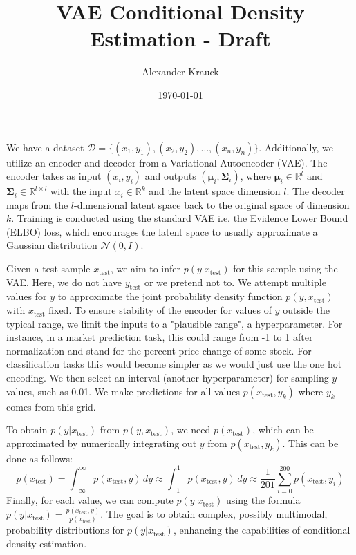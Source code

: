 \documentclass[11pt]{article}
\title{ VAE Conditional Density Estimation - Draft}
\author{ Alexander Krauck}
\date{\today}
\begin{document}
\maketitle	

We have a dataset $\mathcal{D} = \{(x_1, y_1), (x_2, y_2), \dots, (x_n, y_n)\}$. Additionally, we utilize an encoder and decoder from a Variational Autoencoder (VAE). The encoder takes as input $(x_i, y_i)$ and outputs $(\mathbf{\mu}_i, \mathbf{\Sigma}_i)$, where $\mathbf{\mu}_i \in \mathbb{R}^l$ and $\mathbf{\Sigma}_i \in \mathbb{R}^{l \times l}$ with the input $x_i \in \mathbb{R}^k$ and the latent space dimension $l$. The decoder maps from the $l$-dimensional latent space back to the original space of dimension $k$. Training is conducted using the standard VAE i.e. the Evidence Lower Bound (ELBO) loss, which encourages the latent space to usually approximate a Gaussian distribution $\mathcal{N}(0, I)$.

Given a test sample $x_{\text{test}}$, we aim to infer $p(y|x_{\text{test}})$ for this sample using the VAE. Here, we do not have $y_{\text{test}}$ or we pretend not to. We attempt multiple values for $y$ to approximate the joint probability density function $p(y, x_{\text{test}})$ with $x_{\text{test}}$ fixed. To ensure stability of the encoder for values of $y$ outside the typical range, we limit the inputs to a "plausible range", a hyperparameter. For instance, in a market prediction task, this could range from -1 to 1 after normalization and stand for the percent price change of some stock. For classification tasks this would become simpler as we would just use the one hot encoding. We then select an interval (another hyperparameter) for sampling $y$ values, such as 0.01. We make predictions for all values $p(x_{\text{test}}, y_k)$ where $y_k$ comes from this grid.

To obtain $p(y|x_{\text{test}})$ from $p(y, x_{\text{test}})$, we need $p(x_{\text{test}})$, which can be approximated by numerically integrating out $y$ from $p(x_{\text{test}}, y_k)$. This can be done as follows:
\[ p(x_{\text{test}}) = \int_{-\infty}^{\infty} p(x_{\text{test}}, y) \, dy \approx \int_{-1}^{1} p(x_{\text{test}}, y) \, dy \approx \frac{1}{201} \sum_{i=0}^{200} p(x_{\text{test}}, y_i) \]
Finally, for each value, we can compute $p(y|x_{\text{test}})$ using the formula $p(y|x_{\text{test}}) = \frac{p(x_{\text{test}}, y)}{p(x_{\text{test}})}$. The goal is to obtain complex, possibly multimodal, probability distributions for $p(y|x_{\text{test}})$, enhancing the capabilities of conditional density estimation.
\end{document}
